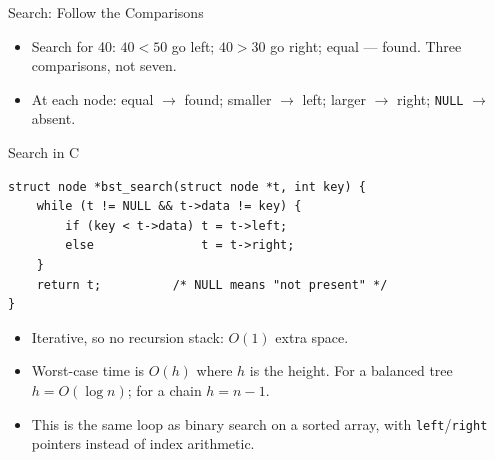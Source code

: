 \documentclass[aspectratio=169]{beamer}
\begin{document}
\begin{frame}{Search: Follow the Comparisons}
  \begin{center}
  \end{center}
  \vspace{-0.15cm}
  \begin{itemize}
    \item Search for 40: $40<50$ go left; $40>30$ go right; equal --- found.
      Three comparisons, not seven.
    \item At each node: equal $\to$ found; smaller $\to$ left; larger
      $\to$ right; \texttt{NULL} $\to$ absent.
  \end{itemize}
\end{frame}

\begin{frame}[fragile]{Search in C}
  \scriptsize
\begin{verbatim}
struct node *bst_search(struct node *t, int key) {
    while (t != NULL && t->data != key) {
        if (key < t->data) t = t->left;
        else               t = t->right;
    }
    return t;          /* NULL means "not present" */
}
\end{verbatim}
  \vspace{0.1cm}
  \footnotesize
  \begin{itemize}
    \item Iterative, so no recursion stack: $O(1)$ extra space.
    \item Worst-case time is $O(h)$ where $h$ is the height. For a balanced
      tree $h=O(\log n)$; for a chain $h=n-1$.
    \item This is the same loop as binary search on a sorted array, with
      \texttt{left}/\texttt{right} pointers instead of index arithmetic.
  \end{itemize}
\end{frame}
\end{document}
